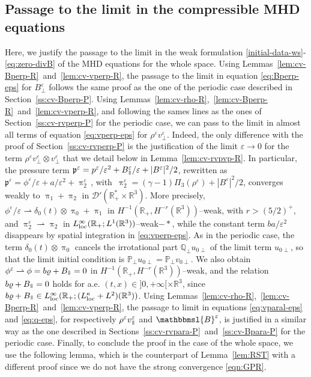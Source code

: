 \documentclass[11pt,reqno]{amsart}
\def \R{{\mathbb{R}}}
\def \Q{{\mathbb{Q}}}
\def \P{{\mathbb{P}}}
\newcommand{\myparallel}{{\mkern3mu\vphantom{\perp}\vrule depth 0pt\mkern2mu\vrule depth 0pt\mkern3mu}}
\begin{document}
\subsection{Passage to the limit in the compressible MHD equations}
Here, we justify the passage to the limit in the weak formulation \eqref{initial-data-ws}-\eqref{eq:zero-divB} of the MHD equations for the whole space. Using Lemmas~\ref{lem:cv-Bperp-R}~and~\ref{lem:cv-vperp-R}, the passage to the limit in equation \eqref{eq:Bperp-eps} for $B_\perp^\varepsilon$ follows the same proof as the one of the periodic case described in Section~\ref{ss:cv-Bperp-P}. Using Lemmas~\ref{lem:cv-rho-R},~\ref{lem:cv-Bperp-R}~and~\ref{lem:cv-vperp-R}, and following the sames lines as the ones of Section~\ref{ss:cv-rvperp-P} for the periodic case, we can pass to the limit in almost all terms of equation \eqref{eq:vperp-eps} for $\rho^\varepsilon v_\perp^\varepsilon$. Indeed, the only difference with the proof of Section~\ref{ss:cv-rvperp-P} is the justification of the limit $\varepsilon\rightarrow 0$ for the term $ \rho^\varepsilon v_\perp^\varepsilon \otimes v_\perp^\varepsilon$ that we detail below in Lemma~\ref{lem:cv-rvpvp-R}. In particular, the pressure term $\mathfrak p^\varepsilon = p^\varepsilon /\varepsilon^2 + B_\myparallel^\varepsilon/\varepsilon + |B^\varepsilon|^2/2$, rewritten as $\mathfrak p^\varepsilon =\phi^\varepsilon/\varepsilon +  a /\varepsilon^2+ \uppi_2^\varepsilon\,$, with $\, \uppi_2^\varepsilon = (\gamma-1)\Pi_3(\rho^\varepsilon) + |B^\varepsilon|^2/2$, converges weakly to  $\uppi_1 + \uppi_2$ in  $\mathcal D'(\R_+^*\times \R^3)$. More precisely,  $\phi^\varepsilon/\varepsilon \rightharpoonup  \delta_0(t) \otimes\uppi_0  +\uppi_1$ in $H^{-1}(\R_+, H^{-r}(\R^3))$--weak, with $r>(5/2)^+$, and $\uppi_2^\varepsilon \rightharpoonup \uppi_2$ in $ L_{\rm loc}^\infty(\R_+;L^1(\R^3))$--weak$-*$, while the constant term $ba /\varepsilon^2$  disappears by spatial integration in \eqref{eq:vperp-eps}. As in the periodic case, the term $\delta_0(t)\otimes \uppi_0 $ cancels the irrotational part  $\Q_\perp u_{0 \perp }$ of the limit term $u_{0 \perp }$, so that  the limit initial condition is $\P_\perp u_{0 \perp }=\P_\perp v_{0 \perp }$. We also obtain $\phi^\varepsilon \rightharpoonup \phi=b \varrho + B_\myparallel =0$ in $H^{-1}(\R_+, H^{-r}(\R^3))$--weak, and the relation $b \varrho + B_\myparallel =0$ holds for a.e. $(t,x) \in ]0,+\infty[\times \R^3$, since $b \varrho + B_\myparallel \in L_{\rm loc}^\infty(\R_+;(L_{\rm loc}^\kappa+L^2)(\R^3))$. Using Lemmas~\ref{lem:cv-rho-R},~\ref{lem:cv-Bperp-R}~and~\ref{lem:cv-vperp-R}, the passage to limit in equations \eqref{eq:vparal-eps} and  \eqref{eq:q-eps}, for respectively  $\rho^\varepsilon v_\myparallel^\varepsilon$ and $\mathbbmsl{B}^\varepsilon$, is justified in a similar way as the one described in Sections~\ref{ss:cv-rvpara-P}~and~\ref{ss:cv-Bpara-P} for the periodic case. Finally, to conclude the proof in the case of the whole space, we use the following lemma, which is the counterpart of Lemma~\ref{lem:RST} with a different proof since we do not have the strong convergence \eqref{eqn:GPR}.
\end{document}
